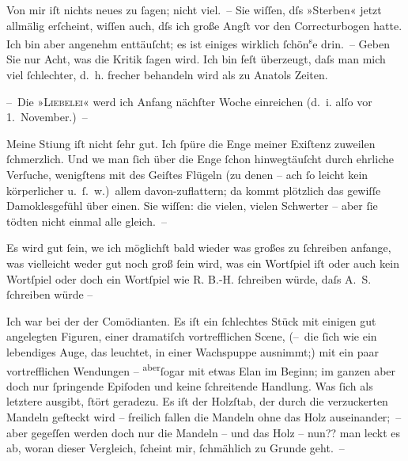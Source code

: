 \pstart
           Von mir iſt nichts neues zu ſagen; nicht viel. – Sie wiſſen, dſs »Sterben« jetzt allmälig erſcheint, wiſſen auch, dſs ich große
               Angſt vor den Correctur{\pb}bogen hatte. Ich bin aber
               angenehm enttäuſcht; es ist einiges wirklich ſchön\substVorne{}\textsuperscript{s}\substDazwischen{}e\substHinten{} drin. – Geben Sie nur Acht, was die Kritik ſagen wird. Ich bin feſt
               überzeugt, daſs man mich viel ſchlechter, d. h. frecher behandeln wird als zu Anatols Zeiten.\pend
           
\pstart
           – Die »\textsc{Liebelei}« werd ich Anfang nächſter Woche einreichen (d. i. alſo vor
                  1. November.) –\pend
           
\pstart
           Meine Sti{\geminationm}ung iſt nicht ſehr gut. Ich ſpüre die Enge
               meiner Exiſtenz zuweilen ſchmerzlich. Und we{\geminationn} man ſich
               über die Enge ſchon hinwegtäuſcht durch ehrliche Verſuche, wenigſtens mit des Geiſtes
               Flügeln (zu denen – ach ſo leicht kein körperlicher u. ſ. w.) allem davon-zu{\pb}flattern; da kommt plötzlich das gewiſſe
               Damoklesgefühl über einen. Sie wiſſen: die vielen, vielen Schwerter – aber ſie tödten
               nicht einmal alle gleich. –\pend
           
\pstart
           Es wird gut ſein, we{\geminationn} ich möglichſt bald wieder was
               großes zu ſchreiben anfange, was vielleicht weder gut noch groß ſein wird, was ein
               Wortſpiel iſt oder auch kein Wortſpiel oder doch ein Wortſpiel wie \textsc{R. B.-H.}{ }ſchreiben würde, daſs A. S. ſchreiben würde –\pend
           
\pstart
           Ich war bei der \label{K_L00392-1v}\label{K_L00392-1} der Comödianten. Es iſt ein ſchlechtes
               Stück mit einigen gut angelegten Figuren, einer dramatiſch {\pb}vortrefflichen Scene, (– die \introOben{}ſich\introOben{} wie ein lebendiges Auge, das leuchtet,  in einer Wachspuppe ausnimmt;) mit ein paar vortrefflichen
               Wendungen – \substVorne{}\textsuperscript{aber}\substDazwischen{}ſogar\substHinten{} mit etwas Elan im Beginn; im ganzen aber doch nur ſpringende Epiſoden und
               keine ſchreitende Handlung. Was ſich als letztere ausgibt, ſtört geradezu. Es iſt der
               Holzſtab, der durch die verzuckerten Mandeln geſteckt wird – freilich fallen die
               Mandeln ohne das Holz auseinander; – aber gegeſſen werden doch nur die Mandeln – und
               das Holz – nun?? man leckt es ab, woran dieser Vergleich, ſcheint mir, {\pb}ſchmählich zu Grunde geht. –\pend
           

